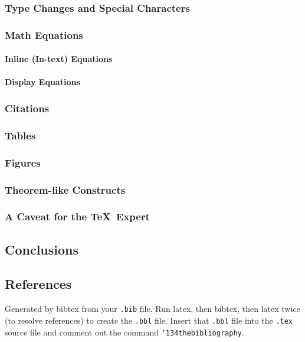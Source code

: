 \documentclass[sigconf]{acmart}
\begin{document}
\subsubsection{Type Changes and  Special Characters}
\subsubsection{Math Equations}
\paragraph{Inline (In-text) Equations}
\paragraph{Display Equations}
\subsubsection{Citations}
\subsubsection{Tables}
\subsubsection{Figures}
\subsubsection{Theorem-like Constructs}
\subsubsection*{A Caveat for the \TeX\ Expert}
\subsection{Conclusions}
\subsection{References}

Generated by bibtex from your \texttt{.bib} file.  Run latex, then
bibtex, then latex twice (to resolve references) to create the
\texttt{.bbl} file.  Insert that \texttt{.bbl} file into the
\texttt{.tex} source file and comment out the command
\texttt{{\char'134}thebibliography}.

\end{document}
